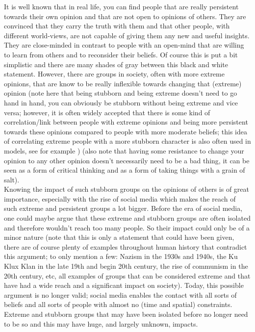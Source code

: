 \documentclass[11 pt , letterpaper , twoside , openright]{book}
\begin{document}
It is well known that in real life, you can find people that are really persistent towards their own opinion and that are not open to opinions of others. They are convinced that they carry the truth with them and that other people, with different world-views, are not capable of giving them any new and useful insights. They are close-minded in contrast to people with an open-mind that are willing to learn from others and to reconsider their beliefs. Of course this is put a bit simplistic and there are many shades of gray between this black and white statement. However, there are groups in society, often with more extreme opinions, that are know to be really inflexible towards changing that (extreme) opinion (note here that being stubborn and being extreme doesn't need to go hand in hand, you can obviously be stubborn without being extreme and vice versa; however, it is often widely accepted that there is some kind of correlation/link between people with extreme opinions and being more persistent towards these opinions compared to people with more moderate beliefs; this idea of correlating extreme people with a more stubborn character is also often used in models, see for example \cite{Deffuant2006}\cite{Deffuant2002}\cite{Turner}) (also note that having some resistance to change your opinion to any other opinion doesn't necessarily need to be a bad thing, it can be seen as a form of critical thinking and as a form of taking things with a grain of salt).\\ 
\newline
Knowing the impact of such stubborn groups on the opinions of others is of great importance, especially with the rise of social media which makes the reach of such extreme and persistent groups a lot bigger. Before the era of social media, one could maybe argue that these extreme and stubborn groups are often isolated and therefore wouldn't reach too many people. So their impact could only be of a minor nature (note that this is only a statement that could have been given, there are of course plenty of examples throughout human history that contradict this argument; to only mention a few: Nazism in the 1930s and 1940s, the Ku Klux Klan in the late 19th and begin 20th century, the rise of communism in the 20th century, etc, all examples of groups that can be considered extreme and that have had a wide reach and a significant impact on society). Today, this possible argument is no longer valid; social media enables the contact with all sorts of beliefs and all sorts of people with almost no (time and spatial) constraints. Extreme and stubborn groups that may have been isolated before no longer need to be so and this may have huge, and largely unknown, impacts. \\
\end{document}

